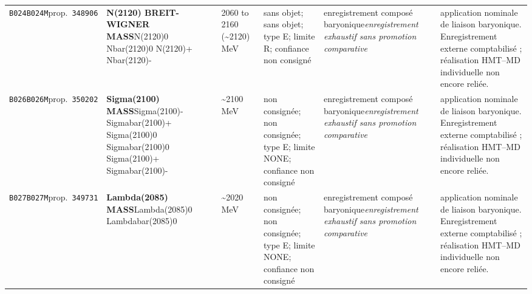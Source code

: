 \begin{landscape}
\begin{longtable}{L{1.85cm}L{4.45cm}L{2.35cm}L{4.05cm}L{3.35cm}L{7.15cm}}
\texttt{B024}\newline \texttt{B024M}\newline prop.\ \texttt{348906} & \textbf{N(2120) BREIT-WIGNER MASS}\newline N(2120)0 \textbar{}\allowbreak{} Nbar(2120)0 \textbar{}\allowbreak{} N(2120)+ \textbar{}\allowbreak{} Nbar(2120)- & 2060 to 2160 (\textasciitilde{}2120)\,MeV & sans objet; sans objet; type E; limite R; confiance non consigné & enregistrement composé baryonique\newline \emph{enregistrement exhaustif sans promotion comparative} & application nominale de liaison baryonique. Enregistrement externe comptabilisé ; réalisation HMT--MD individuelle non encore reliée. \\
\texttt{B026}\newline \texttt{B026M}\newline prop.\ \texttt{350202} & \textbf{Sigma(2100) MASS}\newline Sigma(2100)- \textbar{}\allowbreak{} Sigmabar(2100)+ \textbar{}\allowbreak{} Sigma(2100)0 \textbar{}\allowbreak{} Sigmabar(2100)0 \textbar{}\allowbreak{} Sigma(2100)+ \textbar{}\allowbreak{} Sigmabar(2100)- & \textasciitilde{}2100\,MeV & non consignée; non consignée; type E; limite NONE; confiance non consigné & enregistrement composé baryonique\newline \emph{enregistrement exhaustif sans promotion comparative} & application nominale de liaison baryonique. Enregistrement externe comptabilisé ; réalisation HMT--MD individuelle non encore reliée. \\
\texttt{B027}\newline \texttt{B027M}\newline prop.\ \texttt{349731} & \textbf{Lambda(2085) MASS}\newline Lambda(2085)0 \textbar{}\allowbreak{} Lambdabar(2085)0 & \textasciitilde{}2020\,MeV & non consignée; non consignée; type E; limite NONE; confiance non consigné & enregistrement composé baryonique\newline \emph{enregistrement exhaustif sans promotion comparative} & application nominale de liaison baryonique. Enregistrement externe comptabilisé ; réalisation HMT--MD individuelle non encore reliée. \\

\end{longtable}
\end{landscape}
